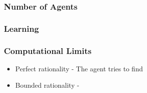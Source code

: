 \subsubsection{Number of Agents}


\subsubsection{Learning}


\subsubsection{Computational Limits}



\begin{itemize}
  \item Perfect rationality - The agent tries to find 
  \item Bounded rationality -
\end{itemize}
